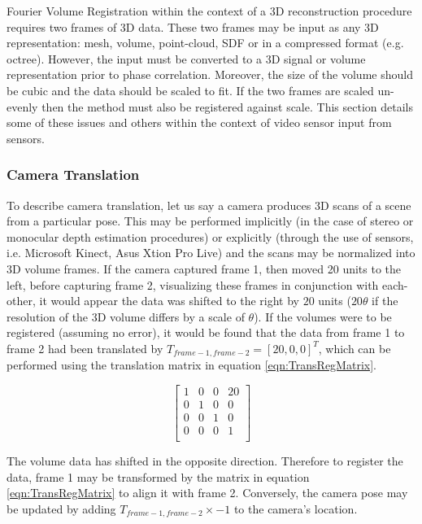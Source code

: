 Fourier Volume Registration within the context of a 3D reconstruction procedure requires two frames of 3D data. These two frames may be input as any 3D representation: mesh, volume, point-cloud, SDF or in a compressed format (e.g. octree). However, the input must be converted to a 3D signal or volume representation prior to phase correlation. Moreover, the size of the volume should be cubic and the data should be scaled to fit. If the two frames are scaled un-evenly then the method must also be registered against scale. This section details some of these issues and others within the context of video sensor input from sensors.  \\
 

\subsubsection{Camera Translation}
\label{sec:PCForSLAM}
To describe camera translation, let us say a camera produces 3D scans of a scene from a particular pose. This may be performed implicitly (in the case of stereo or monocular depth estimation procedures) or explicitly (through the use of sensors, i.e. Microsoft Kinect, Asus Xtion Pro Live) and the scans may be normalized into 3D volume frames. If the camera captured frame 1, then moved 20 units to the left, before capturing frame 2, visualizing these frames in conjunction with each-other, it would appear the data was shifted to the right by $20$ units ($20\theta$ if the resolution of the 3D volume differs by a scale of $\theta$). If the volumes were to be registered (assuming no error), it would be found that the data from frame 1 to frame 2 had been translated by $T_{frame-1,frame-2} = [20,0,0]^T$, which can be performed using the translation matrix in equation \ref{eqn:TransRegMatrix}.

\begin{equation} \label{eqn:TransRegMatrix}
\left[
\begin{array}{cccc}
1 & 0 & 0 & 20 \\
0 & 1 & 0 & 0 \\
0 & 0 & 1 & 0 \\
0 & 0 & 0 & 1 \\
\end{array}
\right]
\end{equation}

The volume data has shifted in the opposite direction. Therefore to register the data, frame 1 may be transformed by the matrix in equation \ref{eqn:TransRegMatrix} to align it with frame 2. Conversely, the camera pose may be updated by adding $T_{frame-1,frame-2} \times -1$ to the camera's location.  \\

